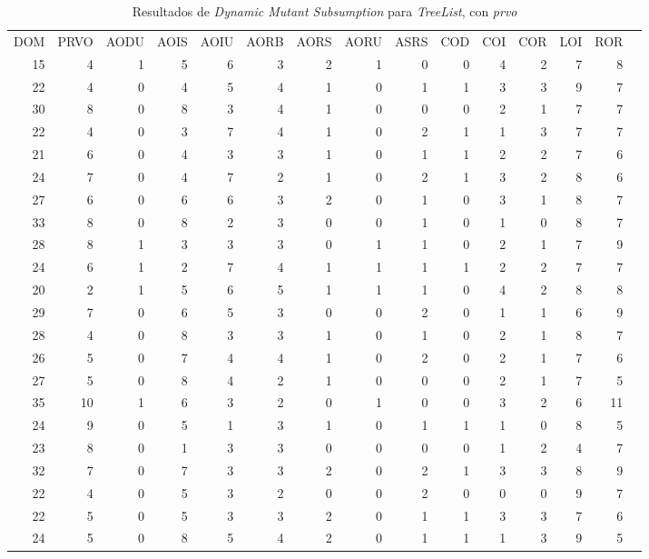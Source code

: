 \begin{table}[]
	\caption{Resultados de \emph{Dynamic Mutant Subsumption} para \emph{TreeList}, con \emph{prvo}}
	\label{tables.results.subsumption.treelist.prvo}
	\centering
	\scriptsize
	\def\arraystretch{0.95}
	\setlength\tabcolsep{0.5mm}
	\begin{tabular}{rrrrrrrrrrrrrrr}
		DOM & PRVO & AODU & AOIS & AOIU & AORB & AORS & AORU & ASRS & COD & COI & COR & LOI & ROR \\
		15 & 4 & 1 & 5 & 6 & 3 & 2 & 1 & 0 & 0 & 4 & 2 & 7 & 8 \\
		22 & 4 & 0 & 4 & 5 & 4 & 1 & 0 & 1 & 1 & 3 & 3 & 9 & 7 \\
		30 & 8 & 0 & 8 & 3 & 4 & 1 & 0 & 0 & 0 & 2 & 1 & 7 & 7 \\
		22 & 4 & 0 & 3 & 7 & 4 & 1 & 0 & 2 & 1 & 1 & 3 & 7 & 7 \\
		21 & 6 & 0 & 4 & 3 & 3 & 1 & 0 & 1 & 1 & 2 & 2 & 7 & 6 \\
		24 & 7 & 0 & 4 & 7 & 2 & 1 & 0 & 2 & 1 & 3 & 2 & 8 & 6 \\
		27 & 6 & 0 & 6 & 6 & 3 & 2 & 0 & 1 & 0 & 3 & 1 & 8 & 7 \\
		33 & 8 & 0 & 8 & 2 & 3 & 0 & 0 & 1 & 0 & 1 & 0 & 8 & 7 \\
		28 & 8 & 1 & 3 & 3 & 3 & 0 & 1 & 1 & 0 & 2 & 1 & 7 & 9 \\
		24 & 6 & 1 & 2 & 7 & 4 & 1 & 1 & 1 & 1 & 2 & 2 & 7 & 7 \\
		20 & 2 & 1 & 5 & 6 & 5 & 1 & 1 & 1 & 0 & 4 & 2 & 8 & 8 \\
		29 & 7 & 0 & 6 & 5 & 3 & 0 & 0 & 2 & 0 & 1 & 1 & 6 & 9 \\
		28 & 4 & 0 & 8 & 3 & 3 & 1 & 0 & 1 & 0 & 2 & 1 & 8 & 7 \\
		26 & 5 & 0 & 7 & 4 & 4 & 1 & 0 & 2 & 0 & 2 & 1 & 7 & 6 \\
		27 & 5 & 0 & 8 & 4 & 2 & 1 & 0 & 0 & 0 & 2 & 1 & 7 & 5 \\
		35 & 10 & 1 & 6 & 3 & 2 & 0 & 1 & 0 & 0 & 3 & 2 & 6 & 11 \\
		24 & 9 & 0 & 5 & 1 & 3 & 1 & 0 & 1 & 1 & 1 & 0 & 8 & 5 \\
		23 & 8 & 0 & 1 & 3 & 3 & 0 & 0 & 0 & 0 & 1 & 2 & 4 & 7 \\
		32 & 7 & 0 & 7 & 3 & 3 & 2 & 0 & 2 & 1 & 3 & 3 & 8 & 9 \\
		22 & 4 & 0 & 5 & 3 & 2 & 0 & 0 & 2 & 0 & 0 & 0 & 9 & 7 \\
		22 & 5 & 0 & 5 & 3 & 3 & 2 & 0 & 1 & 1 & 3 & 3 & 7 & 6 \\
		24 & 5 & 0 & 8 & 5 & 4 & 2 & 0 & 1 & 1 & 1 & 3 & 9 & 5 \\

\end{tabular}
\end{table}
